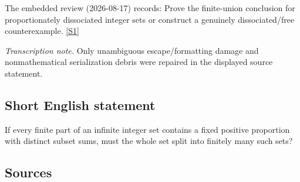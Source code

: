 \documentclass[11pt,a4paper]{article}
\newcommand{\sref}[2]{\hyperlink{source:#1:#2}{[S#2]}}
\begin{document}
The embedded review (2026-08-17) records: Prove the finite-union conclusion for proportionately dissociated integer sets or construct a genuinely dissociated/free counterexample. \sref{statement}{1}

{\small\emph{Transcription note.} Only unambiguous escape/formatting damage and nonmathematical serialization debris were repaired in the displayed source statement.}

\subsection{Short English statement}

If every finite part of an infinite integer set contains a fixed positive proportion with distinct subset sums, must the whole set split into finitely many such sets?

\subsection{Sources}
\end{document}

